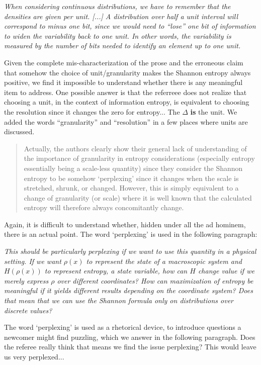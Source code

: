\documentclass[11pt]{article}
\begin{document}
\emph{	When considering continuous distributions, we have to remember that the densities are given per unit. [...] A distribution over half a unit interval will correspond to minus one bit, since we would need to ``lose'' one bit of information to widen the variability back to one unit. In other words, the variability is measured by the number of bits needed to identify an element up to one unit.}

Given the complete mis-characterization of the prose and the erroneous claim that somehow the choice of unit/granularity makes the Shannon entropy always positive, we find it impossible to understand whether there is any meaningful item to address. One possible answer is that the referreee does not realize that choosing a unit, in the context of information entropy, is equivalent to choosing the resolution since it changes the zero for entropy... The $\Delta$ \textbf{is} the unit. We added the words ``granularity'' and ``resolution'' in a few places where units are discussed. 

\begin{quote}
Actually, the authors clearly show their general lack of understanding of the importance of granularity in entropy considerations (especially entropy essentially being a scale-less quantity) since they consider the Shannon entropy to be somehow ‘perplexing’ since it changes when the scale is stretched, shrunk, or changed. However, this is simply equivalent to a change of granularity (or scale) where it is well known that the calculated entropy will therefore always concomitantly change. 
\end{quote}
Again, it is difficult to understand whether, hidden under all the ad hominem, there is an actual point. The word `perplexing' is used in the following paragraph:

\emph{	This should be particularly perplexing if we want to use this quantity in a physical setting. If we want $\rho(x)$ to represent the state of a macroscopic system and $H(\rho(x))$ to represent entropy, a state variable, how can $H$ change value if we merely express $\rho$ over different coordinates? How can maximization of entropy be meaningful if it yields different results depending on the coordinate system? Does that mean that we can use the Shannon formula only on distributions over discrete values?}

The word `perplexing' is used as a rhetorical device, to introduce questions a newcomer might find puzzling, which we answer in the following paragraph. Does the referee really think that means we find the issue perplexing? This would leave us very perplexed...
\end{document}
